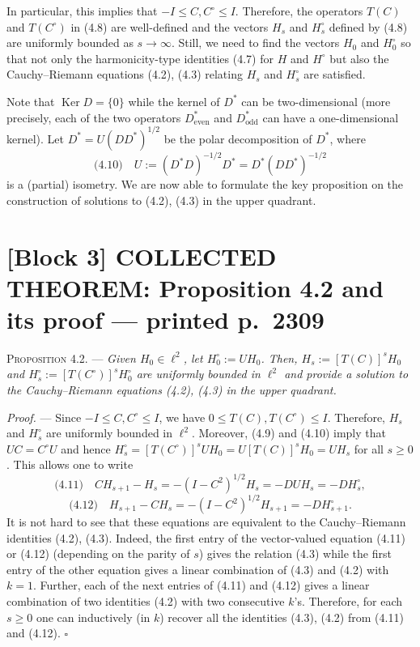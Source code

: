 \documentclass[11pt]{article}
\newcommand{\eql}[1]{\text{(#1)}\quad}
\begin{document}
In particular, this implies that $-I \leqslant C, C^{\circ} \leqslant I$.
Therefore, the operators $T(C)$ and $T(C^{\circ})$ in (4.8) are well-defined
and the vectors $H_s$ and $H_s^{\circ}$ defined by (4.8) are uniformly
bounded as $s \to \infty$. Still, we need to find the vectors $H_0$ and
$H_0^{\circ}$ so that not only the harmonicity-type identities (4.7) for $H$
and $H^{\circ}$ but also the Cauchy--Riemann equations (4.2), (4.3) relating
$H_s$ and $H_s^{\circ}$ are satisfied.

Note that $\operatorname{Ker} D = \{0\}$ while the kernel of $D^{*}$ can be
two-dimensional (more precisely, each of the two operators
$D^{*}_{\mathrm{even}}$ and $D^{*}_{\mathrm{odd}}$ can have a
one-dimensional kernel). Let $D^{*} = U(DD^{*})^{1/2}$ be the polar
decomposition of $D^{*}$, where
\[
\eql{4.10} U := (D^{*}D)^{-1/2}D^{*} = D^{*}(DD^{*})^{-1/2}
\]
is a (partial) isometry. We are now able to formulate the key proposition on
the construction of solutions to (4.2), (4.3) in the upper quadrant.

\section*{[Block 3] COLLECTED THEOREM: Proposition 4.2 and its proof --- printed p.~2309}

\medskip
\noindent\textsc{Proposition 4.2.} --- \emph{Given $H_0 \in \ell^2$, let
$H_0^{\circ} := UH_0$. Then, $H_s := [T(C)]^sH_0$ and
$H_s^{\circ} := [T(C^{\circ})]^sH_0^{\circ}$ are uniformly bounded in
$\ell^2$ and provide a solution to the Cauchy--Riemann equations (4.2), (4.3)
in the upper quadrant.}

\medskip
\noindent\emph{Proof.} --- Since $-I \leqslant C, C^{\circ} \leqslant I$, we
have $0 \leqslant T(C), T(C^{\circ}) \leqslant I$. Therefore, $H_s$ and
$H_s^{\circ}$ are uniformly bounded in $\ell^2$. Moreover, (4.9) and (4.10)
imply that $UC = C^{\circ}U$ and hence
$H_s^{\circ} = [T(C^{\circ})]^sUH_0 = U[T(C)]^sH_0 = UH_s$ for all
$s \geqslant 0$. This allows one to write
\[
\eql{4.11} CH_{s+1}-H_s = -(I-C^2)^{1/2}H_s = -DUH_s = -DH_s^{\circ},
\]
\[
\eql{4.12} H_{s+1}-CH_s = -(I-C^2)^{1/2}H_{s+1} = -DH_{s+1}^{\circ}.
\]
It is not hard to see that these equations are equivalent to the
Cauchy--Riemann identities (4.2), (4.3). Indeed, the first entry of the
vector-valued equation (4.11) or (4.12) (depending on the parity of $s$)
gives the relation (4.3) while the first entry of the other equation gives a
linear combination of (4.3) and (4.2) with $k = 1$. Further, each of the next
entries of (4.11) and (4.12) gives a linear combination of two identities
(4.2) with two consecutive $k$'s. Therefore, for each $s \geqslant 0$ one can
inductively (in $k$) recover all the identities (4.3), (4.2) from (4.11) and
(4.12). \hfill$\square$
\end{document}
